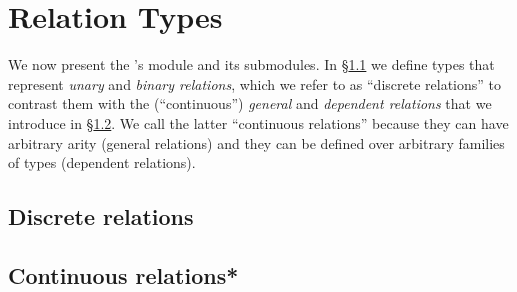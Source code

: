 \section{Relation Types}\label{sec:relat-quot-types}
We now present the \agdaualib's  module and its submodules. In \S\ref{sec:discrete-relations} we define types that represent \emph{unary} and \emph{binary relations}, which we refer to as ``discrete relations'' to contrast them with the (``continuous'') \emph{general} and \emph{dependent relations} that we introduce in \S\ref{sec:continuous-relations}. We call the latter ``continuous relations'' because they can have arbitrary arity (general relations) and they can be defined over arbitrary families of types (dependent relations).

\subsection{Discrete relations}\label{sec:discrete-relations}


\subsection{Continuous relations*\protect\footnotemark}\label{sec:continuous-relations}


